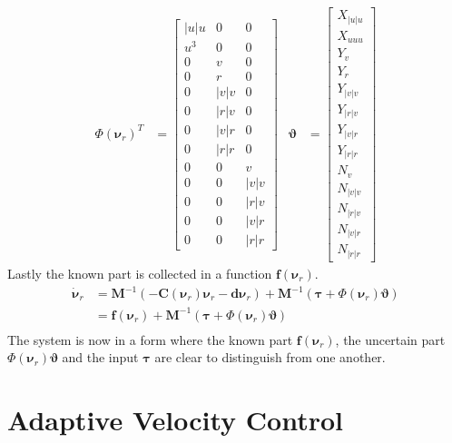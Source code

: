 \documentclass[12pt,a4]{article}
\begin{document}
\begin{align}
	\Phi(\bm{\nu}_r)^T & = \begin{bmatrix}
		|u|u & 0 & 0 \\ u^3 & 0 & 0 \\ 0& v &0 \\ 0& r &0 \\ 0&|v|v&0  \\ 0&|r|v&0  \\ 0&|v|r&0  \\ 0&|r|r&0  \\ 0&0& v \\ 0&0& |v|v \\ 0&0&|r|v \\ 0&0&|v|r \\ 0&0&|r|r
	\end{bmatrix}
	                   &
	\bm{\vartheta}     & = \begin{bmatrix}
		X_{|u|u} \\ X_{uuu} \\ Y_v \\ Y_r \\ Y_{|v|v} \\ Y_{|r|v} \\ Y_{|v|r} \\ Y_{|r|r} \\ N_v \\ N_{|v|v} \\ N_{|r|v} \\ N_{|v|r} \\ N_{|r|r}
	\end{bmatrix}
\end{align}
Lastly the known part is collected in a function $\bm{f}(\bm{\nu}_r)$.
\begin{align}
	\bm{\dot{\nu}}_r & = \bm{M}^{-1} (-\bm{C}(\bm{\nu}_r)\bm{\nu}_r -\bm{d} \bm{\nu}_r) + \bm{M}^{-1} (\bm{\tau} + \Phi(\bm{\nu}_r )\bm{\vartheta}) \\
	                 & =  \bm{f}(\bm{\nu}_r) + \bm{M}^{-1} (\bm{\tau} + \Phi(\bm{\nu}_r )\bm{\vartheta})                                            \\
\end{align}
The system is now in a form where the known part $\bm{f}(\bm{\nu}_r)$, the uncertain part $\Phi(\bm{\nu}_r )\bm{\vartheta}$ and the input $\bm{\tau}$
are clear to distinguish from one another.

\section{Adaptive Velocity Control}
\end{document}
